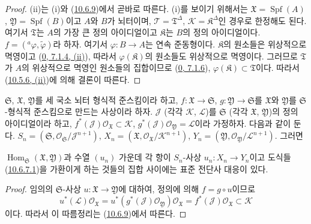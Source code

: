 \begin{proof}
(ii)는 (i)와 (\hyperref[I.10.6.9-ko]{10.6.9})에서 곧바로 따른다.
(i)를 보이기 위해서는 $\mathfrak{X}=\operatorname{Spf}(A)$,
$\mathfrak{Y}=\operatorname{Spf}(B)$이고 $A$와 $B$가 뇌터이며,
$\mathscr{T}=\mathfrak{T}^\Delta$,
$\mathscr{K}=\mathfrak{K}^\Delta$인 경우로 한정해도 된다. 여기서
$\mathfrak{T}$는 $A$의 가장 큰 정의 아이디얼이고
$\mathfrak{K}$는 $B$의 정의 아이디얼이다.
$f=({}^a\varphi,\widetilde{\varphi})$라 하자. 여기서
$\varphi:B\to A$는 연속 준동형이다. $\mathfrak{K}$의 원소들은
위상적으로 멱영이고
(\hyperref[0.7.1.4-ko]{0, 7.1.4, (ii)}), 따라서
$\varphi(\mathfrak{K})$의 원소들도 위상적으로 멱영이다. 그러므로
$\mathfrak{T}$가 $A$의 위상적으로 멱영인 원소들의 집합이므로
(\hyperref[0.7.1.6-ko]{0, 7.1.6}),
$\varphi(\mathfrak{K})\subset\mathfrak{T}$이다. 따라서
(\hyperref[I.10.5.6-ko]{10.5.6, (ii)})에 의해 결론이 따른다.
\end{proof}

\begin{corollary}[10.6.11]
\label{I.10.6.11-ko}
$\mathfrak{S}$, $\mathfrak{X}$, $\mathfrak{Y}$를 세 국소 뇌터
형식적 준스킴이라 하고,
$f:\mathfrak{X}\to\mathfrak{S}$,
$g:\mathfrak{Y}\to\mathfrak{S}$를 $\mathfrak{X}$와
$\mathfrak{Y}$를 $\mathfrak{S}$-형식적 준스킴으로 만드는 사상이라 하자.
$\mathscr{J}$ (각각 $\mathscr{K}$, $\mathscr{L}$)를
$\mathfrak{S}$ (각각 $\mathfrak{X}$, $\mathfrak{Y}$)의 정의 아이디얼이라 하고,
$f^*(\mathscr{J})\mathscr{O}_{\mathfrak{X}}\subset\mathscr{K}$,
$g^*(\mathscr{J})\mathscr{O}_{\mathfrak{Y}}=\mathscr{L}$이라 가정하자.
다음과 같이 둔다.
$S_n=(\mathfrak{S},
\mathscr{O}_{\mathfrak{S}}/\mathscr{J}^{n+1})$,
$X_n=(\mathfrak{X},
\mathscr{O}_{\mathfrak{X}}/\mathscr{K}^{n+1})$,
$Y_n=(\mathfrak{Y},
\mathscr{O}_{\mathfrak{Y}}/\mathscr{L}^{n+1})$.
그러면


$\operatorname{Hom}_{\mathfrak{S}}(\mathfrak{X},\mathfrak{Y})$과 수열
$(u_n)$ 가운데 각 항이 $S_n$-사상
$u_n:X_n\to Y_n$이고 도식들
(\hyperref[I.10.6.7.1-ko]{10.6.7.1})을 가환이게 하는 것들의 집합
사이에는 표준 전단사 대응이 있다.
\end{corollary}

\begin{proof}
임의의 $\mathfrak{S}$-사상
$u:\mathfrak{X}\to\mathfrak{Y}$에 대하여, 정의에 의해
$f=g\circ u$이므로
\[
  u^*(\mathscr{L})\mathscr{O}_{\mathfrak{X}}
  =u^*(g^*(\mathscr{J})\mathscr{O}_{\mathfrak{Y}})
    \mathscr{O}_{\mathfrak{X}}
  =f^*(\mathscr{J})\mathscr{O}_{\mathfrak{X}}
  \subset\mathscr{K}
\]
이다. 따라서 이 따름정리는
(\hyperref[I.10.6.9-ko]{10.6.9})에서 따른다.
\end{proof}

